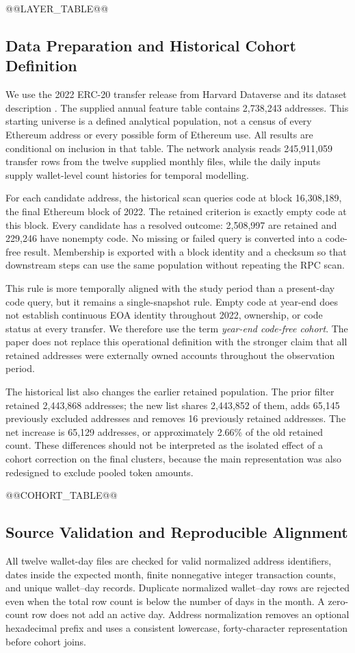 @@LAYER_TABLE@@

\subsection{Data Preparation and Historical Cohort Definition}
We use the 2022 ERC-20 transfer release from Harvard Dataverse and its dataset description \cite{somin2025erc2022,somin2025dataset}. The supplied annual feature table contains 2,738,243 addresses. This starting universe is a defined analytical population, not a census of every Ethereum address or every possible form of Ethereum use. All results are conditional on inclusion in that table. The network analysis reads 245,911,059 transfer rows from the twelve supplied monthly files, while the daily inputs supply wallet-level count histories for temporal modelling.

For each candidate address, the historical scan queries code at block 16,308,189, the final Ethereum block of 2022. The retained criterion is exactly empty code at this block. Every candidate has a resolved outcome: 2,508,997 are retained and 229,246 have nonempty code. No missing or failed query is converted into a code-free result. Membership is exported with a block identity and a checksum so that downstream steps can use the same population without repeating the RPC scan.

This rule is more temporally aligned with the study period than a present-day code query, but it remains a single-snapshot rule. Empty code at year-end does not establish continuous EOA identity throughout 2022, ownership, or code status at every transfer. We therefore use the term \emph{year-end code-free cohort}. The paper does not replace this operational definition with the stronger claim that all retained addresses were externally owned accounts throughout the observation period.

The historical list also changes the earlier retained population. The prior filter retained 2,443,868 addresses; the new list shares 2,443,852 of them, adds 65,145 previously excluded addresses and removes 16 previously retained addresses. The net increase is 65,129 addresses, or approximately 2.66\% of the old retained count. These differences should not be interpreted as the isolated effect of a cohort correction on the final clusters, because the main representation was also redesigned to exclude pooled token amounts.

@@COHORT_TABLE@@

\subsection{Source Validation and Reproducible Alignment}
All twelve wallet-day files are checked for valid normalized address identifiers, dates inside the expected month, finite nonnegative integer transaction counts, and unique wallet--day records. Duplicate normalized wallet--day rows are rejected even when the total row count is below the number of days in the month. A zero-count row does not add an active day. Address normalization removes an optional hexadecimal prefix and uses a consistent lowercase, forty-character representation before cohort joins.

